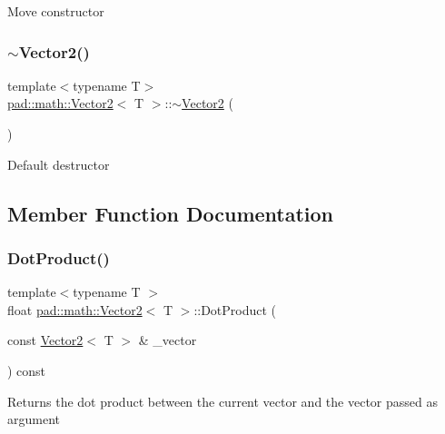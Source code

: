 Move constructor \mbox{\label{structpad_1_1math_1_1_vector2_afb8d7ff79388a1d6fcf2e54a5303bf39}} 
\subsubsection{\texorpdfstring{$\sim$\+Vector2()}{~Vector2()}}
{\footnotesize\ttfamily template$<$typename T$>$ \\
\mbox{\hyperlink{structpad_1_1math_1_1_vector2}{pad\+::math\+::\+Vector2}}$<$ T $>$\+::$\sim$\mbox{\hyperlink{structpad_1_1math_1_1_vector2}{Vector2}} (\begin{DoxyParamCaption}{ }\end{DoxyParamCaption})\hspace{0.3cm}{\ttfamily [default]}}

Default destructor 

\subsection{Member Function Documentation}
\mbox{\label{structpad_1_1math_1_1_vector2_a4e06866137ababf33fafbad672c77e75}} 
\subsubsection{\texorpdfstring{Dot\+Product()}{DotProduct()}}
{\footnotesize\ttfamily template$<$typename T $>$ \\
float \mbox{\hyperlink{structpad_1_1math_1_1_vector2}{pad\+::math\+::\+Vector2}}$<$ T $>$\+::Dot\+Product (\begin{DoxyParamCaption}\item[{const \mbox{\hyperlink{structpad_1_1math_1_1_vector2}{Vector2}}$<$ T $>$ \&}]{\+\_\+vector }\end{DoxyParamCaption}) const}

Returns the dot product between the current vector and the vector passed as argument \mbox{\label{structpad_1_1math_1_1_vector2_a5aeeb38488eb3d220506c64d557e94ae}} 
